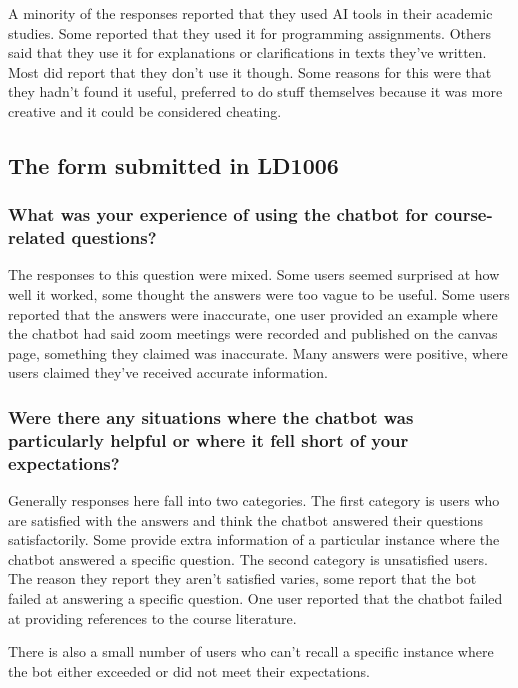 A minority of the responses reported that they used AI tools in their academic studies. Some reported that they used it for programming assignments. Others said that they use it for explanations or clarifications in texts they’ve written. Most did report that they don’t use it though. Some reasons for this were that they hadn’t found it useful, preferred to do stuff themselves because it was more creative and it could be considered cheating.


\subsection{The form submitted in LD1006}


\subsubsection{What was your experience of using the chatbot for course-related questions?}


The responses to this question were mixed. Some users seemed surprised at how well it worked, some thought the answers were too vague to be useful. Some users reported that the answers were inaccurate, one user provided an example where the chatbot had said zoom meetings were recorded and published on the canvas page, something they claimed was inaccurate. Many answers were positive, where users claimed they’ve received accurate information.


\subsubsection{Were there any situations where the chatbot was particularly helpful or where it fell short of your expectations?}


Generally responses here fall into two categories. The first category is users who are satisfied with the answers and think the chatbot answered their questions satisfactorily. Some provide extra information of a particular instance where the chatbot answered a specific question. The second category is unsatisfied users. The reason they report they aren’t satisfied varies, some report that the bot failed at answering a specific question. One user reported that the chatbot failed at providing references to the course literature.


There is also a small number of users who can’t recall a specific instance where the bot either exceeded or did not meet their expectations.


